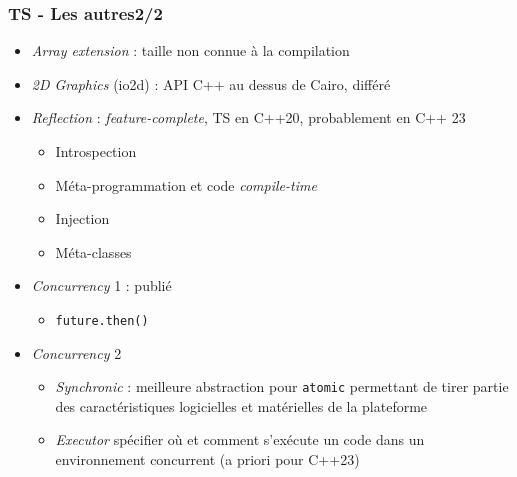 \documentclass[C++.tex]{subfiles}
\begin{document}
\begin{frame}
	\frametitle{TS - Les autres\titlehfill{}2/2}
	\begin{itemize}
		\item \textit{Array extension} : taille non connue à la compilation
		\item \textit{2D Graphics} (io2d) : API C++ au dessus de Cairo, différé


		\item \textit{Reflection} : \textit{feature-complete}, TS en \og C++20\fg{}, probablement en C++ 23
		\begin{itemize}
			\item Introspection
			\item Méta-programmation et code \textit{compile-time}
			\item Injection
			\item Méta-classes
		\end{itemize}


		\item \textit{Concurrency} 1 : publié
		\begin{itemize}
			\item \lstinline|future.then()|
		\end{itemize}
		\item \textit{Concurrency} 2
		\begin{itemize}
			\item \textit{Synchronic} : meilleure abstraction pour \lstinline|atomic| permettant de tirer partie des caractéristiques logicielles et matérielles de la plateforme
			\item \textit{Executor} spécifier où et comment s'exécute un code dans un environnement concurrent (a priori pour C++23)
		\end{itemize}
	\end{itemize}
\end{frame}
\end{document}
